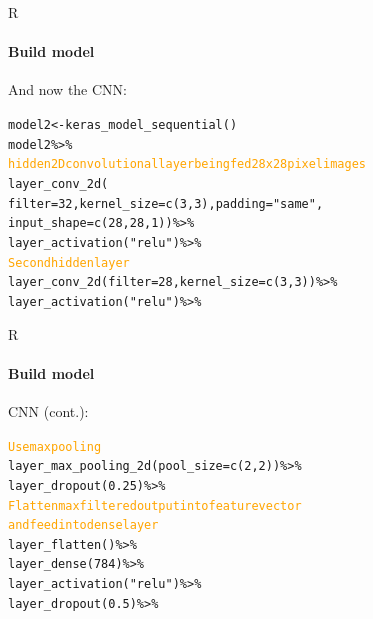 \documentclass{beamer}
\begin{document}
\begin{darkframes}
        \begin{frame}{R}
      \framesubtitle{Build model}
      \begin{block}
      {\small{And now the CNN:}}{\vspace*{-.4cm}}
        \small{\begin{alltt}
            model2 <- keras\_model\_sequential() \\
            model2 \%>\% \\
              \textcolor{orange}{hidden 2D convolutional layer being fed 28x28 pixel images} \\
              layer\_conv\_2d(
                filter = 32, kernel\_size = c(3,3), padding = \text{    } "same", 
                 input\_shape = c(28, 28, 1)) \%>\% \\
              layer\_activation("relu") \%>\% \\
              \textcolor{orange}{Second hidden layer} \\
              layer\_conv\_2d(filter = 28, kernel\_size = c(3,3)) \%>\% \\
              layer\_activation("relu") \%>\%
        \end{alltt}}
      \end{block}
    \end{frame}
    
        \begin{frame}{R}
      \framesubtitle{Build model}
      \begin{block}
      {\small{CNN (cont.):}}{\vspace*{-.4cm}}
        \small{\begin{alltt}
              \textcolor{orange}{Use max pooling} \\
              layer\_max\_pooling\_2d(pool\_size = c(2,2)) \%>\% \\
              layer\_dropout(0.25) \%>\% \\
              \textcolor{orange}{Flatten max filtered output into feature vector} \\
              \textcolor{orange}{and feed into dense layer} \\
              layer\_flatten() \%>\% \\
              layer\_dense(784) \%>\% \\
              layer\_activation("relu") \%>\% \\
              layer\_dropout(0.5) \%>\%
        \end{alltt}}
      \end{block}
    \end{frame}
    

\end{darkframes}
\end{document}
